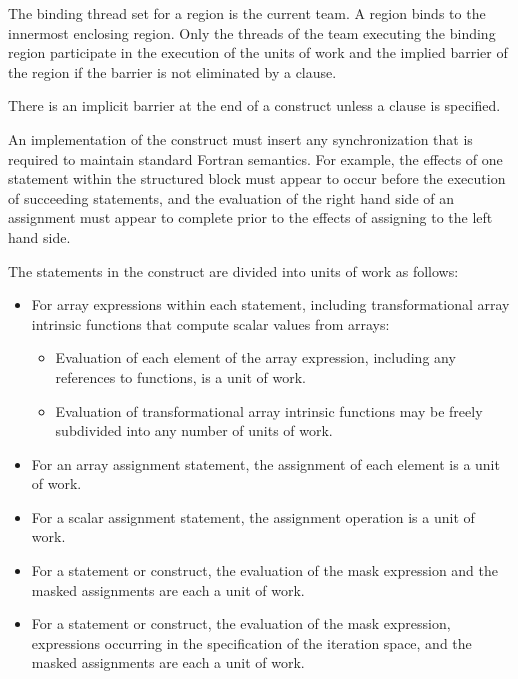 \begin{fortranspecific}
\binding
The binding thread set for a  region is the current team. A 
region binds to the innermost enclosing  region. Only the threads of the team
executing the binding  region participate in the execution of the units of
work and the implied barrier of the  region if the barrier is not eliminated
by a  clause.

\descr
There is an implicit barrier at the end of a  construct unless a 
clause is specified.

An implementation of the  construct must insert any synchronization that is
required to maintain standard Fortran semantics. For example, the effects of one
statement within the structured block must appear to occur before the execution of
succeeding statements, and the evaluation of the right hand side of an assignment must
appear to complete prior to the effects of assigning to the left hand side.

The statements in the  construct are divided into units of work as follows:

\begin{itemize}
\item For array expressions within each statement, including transformational array
intrinsic functions that compute scalar values from arrays:

\begin{itemize} %
\item Evaluation of each element of the array expression, including any references to
 functions, is a unit of work.

\item Evaluation of transformational array intrinsic functions may be freely subdivided
into any number of units of work.
\end{itemize}

\item For an array assignment statement, the assignment of each element is a unit of work.

\item For a scalar assignment statement, the assignment operation is a unit of work.

\item For a  statement or construct, the evaluation of the mask expression and the
masked assignments are each a unit of work.

\item For a  statement or construct, the evaluation of the mask expression,
expressions occurring in the specification of the iteration space, and the masked
assignments are each a unit of work.


\end{itemize}
\end{fortranspecific}
